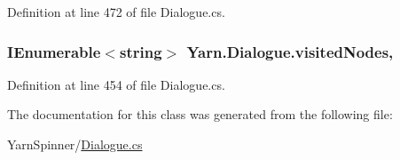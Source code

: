 Definition at line 472 of file Dialogue.\-cs.

\hypertarget{a00094_ac5661051e0b7f44527fe526c7766dbbf}{
\subsubsection[{visited\-Nodes}]{\setlength{\rightskip}{0pt plus 5cm}I\-Enumerable$<$string$>$ Yarn.\-Dialogue.\-visited\-Nodes\hspace{0.3cm}{\ttfamily [get]}, {\ttfamily [set]}}}\label{a00094_ac5661051e0b7f44527fe526c7766dbbf}


Definition at line 454 of file Dialogue.\-cs.



The documentation for this class was generated from the following file\-:\begin{DoxyCompactItemize}
\item 
Yarn\-Spinner/\hyperlink{a00308}{Dialogue.\-cs}\end{DoxyCompactItemize}
